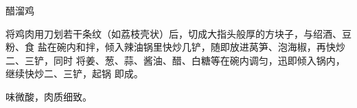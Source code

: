 \begin{recipe}{醋溜鸡}

\ingredients


\cooking

将鸡肉用刀划若干条纹（如荔枝壳状）后，切成大指头般厚的方块子，与绍酒、豆粉、食
盐在碗内和拌，倾入辣油锅里快炒几铲，随即放进莴笋、泡海椒，再快炒二、三铲，同时
将姜、葱、蒜、酱油、醋、白糖等在碗内调匀，迅即倾入锅内，继续快炒二、三铲，起锅
即成。

\notes

味微酸，肉质细致。

\end{recipe}

